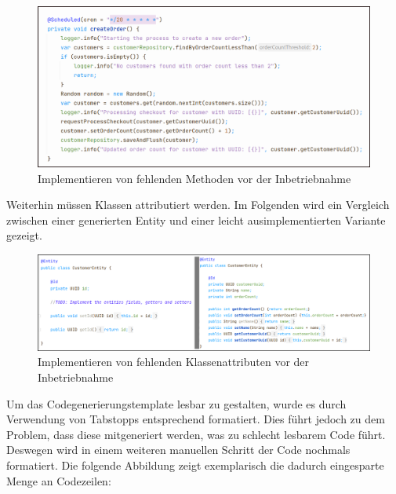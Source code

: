 \begin{figure}[ht]
\centering
\includegraphics[width=\textwidth]{bilder/k7/1_light.png}
\caption{Implementieren von fehlenden Methoden vor der Inbetriebnahme}
\end{figure}

Weiterhin müssen Klassen attributiert werden. Im Folgenden wird ein Vergleich zwischen einer generierten Entity und einer leicht ausimplementierten Variante gezeigt.

\begin{figure}[ht]
\centering
\includegraphics[width=\textwidth]{bilder/k7/2_light.png}
\caption{Implementieren von fehlenden Klassenattributen vor der Inbetriebnahme}
\end{figure}

\newpage

Um das Codegenerierungstemplate lesbar zu gestalten, wurde es durch Verwendung von Tabstopps entsprechend formatiert. Dies führt jedoch zu dem Problem, dass diese mitgeneriert werden, was zu schlecht lesbarem Code führt. Deswegen wird in einem weiteren manuellen Schritt der Code nochmals formatiert. Die folgende Abbildung zeigt exemplarisch die dadurch eingesparte Menge an Codezeilen:

